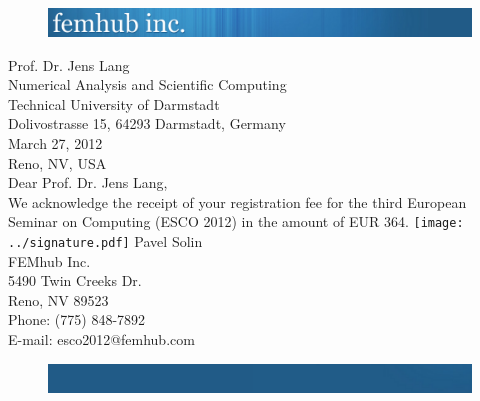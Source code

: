 
\vbox{}
\vspace{-2cm}
\begin{figure}[!ht]
\includegraphics[width=\textwidth]{../femhub_logo.png}
\vspace{1cm}
\end{figure}
\noindent
Prof. Dr. Jens Lang\\
Numerical Analysis and Scientific Computing\\
Technical University of Darmstadt\\
Dolivostrasse 15, 64293 Darmstadt, Germany\\

\noindent
\hbox{} \hfill March 27, 2012\\
\hbox{} \hfill Reno, NV, USA\\
Dear Prof. Dr. Jens Lang,\\
\newline
\noindent
We acknowledge the receipt of your registration fee for the 
third European Seminar on Computing (ESCO 2012) in 
the amount of EUR 364.
\newline
\vspace{1cm}
\newline
\hbox{}
\hspace{-4mm}
\texttt{[image: ../signature.pdf]}
\newline
\noindent
Pavel Solin\\
FEMhub Inc.\\
5490 Twin Creeks Dr.\\
Reno, NV 89523\\
Phone: (775) 848-7892\\
E-mail: esco2012@femhub.com
\begin{figure}[!ht]
\includegraphics[width=\textwidth]{../femhub_footer.png}
\vspace{1cm}
\end{figure}
